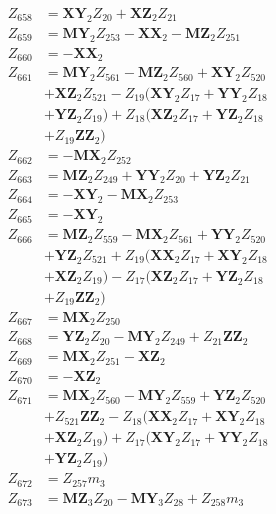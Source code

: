 \begin{multicols}{2}
\begin{align}
Z_{658} &= \mathbf{XY}_2Z_{20} + \mathbf{XZ}_2Z_{21} \nonumber \\
Z_{659} &= \mathbf{MY}_2Z_{253} - \mathbf{XX}_2 - \mathbf{MZ}_2Z_{251} \nonumber \\
Z_{660} &= -\mathbf{XX}_2 \nonumber \\
Z_{661} &= \mathbf{MY}_2Z_{561} - \mathbf{MZ}_2Z_{560} + \mathbf{XY}_2Z_{520}  \nonumber \\
&+ \mathbf{XZ}_2Z_{521} - Z_{19}(\mathbf{XY}_2Z_{17} + \mathbf{YY}_2Z_{18}  \nonumber \\
&+ \mathbf{YZ}_2Z_{19}) + Z_{18}(\mathbf{XZ}_2Z_{17} + \mathbf{YZ}_2Z_{18}  \nonumber \\
&+ Z_{19}\mathbf{ZZ}_2) \nonumber \\
Z_{662} &= -\mathbf{MX}_2Z_{252} \nonumber \\
Z_{663} &= \mathbf{MZ}_2Z_{249} + \mathbf{YY}_2Z_{20} + \mathbf{YZ}_2Z_{21} \nonumber \\
Z_{664} &= - \mathbf{XY}_2 - \mathbf{MX}_2Z_{253} \nonumber \\
Z_{665} &= -\mathbf{XY}_2 \nonumber \\
Z_{666} &= \mathbf{MZ}_2Z_{559} - \mathbf{MX}_2Z_{561} + \mathbf{YY}_2Z_{520}  \nonumber \\
&+ \mathbf{YZ}_2Z_{521} + Z_{19}(\mathbf{XX}_2Z_{17} + \mathbf{XY}_2Z_{18}  \nonumber \\
&+ \mathbf{XZ}_2Z_{19}) - Z_{17}(\mathbf{XZ}_2Z_{17} + \mathbf{YZ}_2Z_{18}  \nonumber \\
&+ Z_{19}\mathbf{ZZ}_2) \nonumber \\
Z_{667} &= \mathbf{MX}_2Z_{250} \nonumber \\
Z_{668} &= \mathbf{YZ}_2Z_{20} - \mathbf{MY}_2Z_{249} + Z_{21}\mathbf{ZZ}_2 \nonumber \\
Z_{669} &= \mathbf{MX}_2Z_{251} - \mathbf{XZ}_2 \nonumber \\
Z_{670} &= -\mathbf{XZ}_2 \nonumber \\
Z_{671} &= \mathbf{MX}_2Z_{560} - \mathbf{MY}_2Z_{559} + \mathbf{YZ}_2Z_{520}  \nonumber \\
&+ Z_{521}\mathbf{ZZ}_2 - Z_{18}(\mathbf{XX}_2Z_{17} + \mathbf{XY}_2Z_{18}  \nonumber \\
&+ \mathbf{XZ}_2Z_{19}) + Z_{17}(\mathbf{XY}_2Z_{17} + \mathbf{YY}_2Z_{18}  \nonumber \\
&+ \mathbf{YZ}_2Z_{19}) \nonumber \\
Z_{672} &= Z_{257}m_3 \nonumber \\
Z_{673} &= \mathbf{MZ}_3Z_{20} - \mathbf{MY}_3Z_{28} + Z_{258}m_3 \nonumber \\

\end{align}
\end{multicols}
